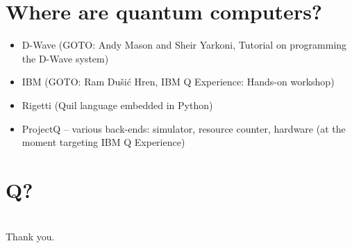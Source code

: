 \documentclass{beamer}
\begin{document}
\begin{frame}{\insertsection}{\insertsubsection}
    
\end{frame}

\begin{frame}{\insertsection}{\insertsubsection}
    
\end{frame}

\section{Where are quantum computers?}

\begin{frame}{\insertsection}
	\begin{itemize}
		\item D-Wave (GOTO: Andy Mason and Sheir Yarkoni, Tutorial on 
		programming the D-Wave system) 
		\item IBM (GOTO: Ram Du\v{s}i\'c Hren, IBM Q Experience: Hands-on 
		workshop)
		\item Rigetti (Quil language embedded in Python)
		\item ProjectQ -- various back-ends: simulator, resource counter, 
		hardware (at the moment targeting IBM Q Experience)
	\end{itemize}
\end{frame}


\section{Q?}
\begin{frame}{\insertsection}
    \begin{center}
        \Huge {\color{iitis-orange} \insertsection}\\[12pt]
        \LARGE Thank you.
    \end{center}
\end{frame}
\end{document}
